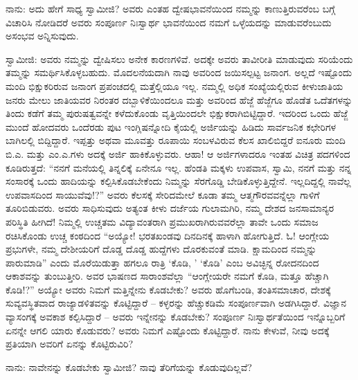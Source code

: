 ನಾನು: ಅದು ಹೇಗೆ ಸಾಧ್ಯ ಸ್ವಾಮೀಜಿ? ಅವರು ಎಂತಹ ದ್ವೇಷಭಾವನೆಯಿಂದ ನಮ್ಮನ್ನು ಕಾಣುತ್ತಿರುವರೆಂಬ ಬಗ್ಗೆ ವಿಚಾರಿಸಿ ನೋಡಿದರೆ ಅವರು ಸಂಪೂರ್ಣ ನಿಃಸ್ವಾರ್ಥ ಭಾವನೆಯಿಂದ ನಮಗೆ ಒಳ್ಳೆಯದನ್ನು ಮಾಡುವರೆಂಬುದು ಅಸಂಭವ ಅನ್ನಿಸುವುದು.

ಸ್ವಾಮೀಜಿ: ಅವರು ನಮ್ಮನ್ನು ದ್ವೇಷಿಸಲು ಅನೇಕ ಕಾರಣಗಳಿವೆ. ಅದಕ್ಕೇ ಅವರು ತಾವೀರೀತಿ ಮಾಡುವುದು ಸರಿಯೆಂದು ತಮ್ಮನ್ನು ಸಮರ್ಥಿಸಿಕೊಳ್ಳಬಹುದು. ಮೊದಲನೆಯದಾಗಿ ನಾವು ಅವರಿಂದ ಜಯಿಸಲ್ಪಟ್ಟ ಜನಾಂಗ. ಅಲ್ಲದೆ ಇಷ್ಟೊಂದು ಮಂದಿ ಭಿಕ್ಷುಕರಿರುವ ಜನಾಂಗ ಪ್ರಪಂಚದಲ್ಲಿ ಮತ್ತೆಲ್ಲಿಯೂ ಇಲ್ಲ. ನಮ್ಮಲ್ಲಿ ಅಧಿಕ ಸಂಖ್ಯೆಯಲ್ಲಿರುವ ಕೀಳುಜಾತಿಯ ಜನರು ಮೇಲು ಜಾತಿಯವರ ನಿರಂತರ ದಬ್ಬಾಳಿಕೆಯಿಂದಲೂ ಮತ್ತು ಅವರಿಂದ ಹೆಜ್ಜೆ ಹೆಜ್ಜೆಗೂ ಹೊಡೆತ ಒದೆತಗಳನ್ನು ತಿಂದು ಕಡೆಗೆ ತಮ್ಮ ಪುರುಷತ್ವವನ್ನೇ ಕಳೆದುಕೊಂಡು ವೃತ್ತಿಯಿಂದಲೇ ಭಿಕ್ಷುಕರಾಗಿಬಿಟ್ಟಿದ್ದಾರೆ. ಇದರಿಂದ ಒಂದು ಹೆಜ್ಜೆ ಮುಂದೆ ಹೋದವರು ಒಂದೆರಡು ಪುಟ ಇಂಗ್ಲಿಷನ್ನೋದಿ ಕೈಯಲ್ಲಿ ಅರ್ಜಿಯನ್ನು ಹಿಡಿದು ಸಾರ್ವಜನಿಕ ಕಛೇರಿಗಳ ಬಾಗಿಲಲ್ಲಿ ಬಿದ್ದಿದ್ದಾರೆ. ಇಪ್ಪತ್ತು ಅಥವಾ ಮೂವತ್ತು ರೂಪಾಯಿ ಸಂಬಳವಿರುವ ಕೆಲಸ ಖಾಲಿಬಿದ್ದರೆ ಐನೂರು ಮಂದಿ ಬಿ.ಎ. ಮತ್ತು ಎಂ.ಎ.ಗಳು ಅದಕ್ಕೆ ಅರ್ಜಿ ಹಾಕಿಕೊಳ್ಳುವರು. ಆಹಾ! ಆ ಅರ್ಜಿಗಳಾದರೂ ಇಂತಹ ವಿಚಿತ್ರ ಪದಗಳಿಂದ ಕೂಡಿರುತ್ತದೆ: “ನನಗೆ ಮನೆಯಲ್ಲಿ ತಿನ್ನಲಿಕ್ಕೆ ಏನೇನೂ ಇಲ್ಲ. ಹೆಂಡತಿ ಮಕ್ಕಳು ಉಪವಾಸ, ಸ್ವಾಮಿ, ನನಗೆ ಮತ್ತು ನನ್ನ ಸಂಸಾರಕ್ಕೆ ಒಂದು ಹಾದಿಯನ್ನು ಕಲ್ಪಿಸಿಕೊಡಬೇಕೆಂದು ನಿಮ್ಮನ್ನು ಸೆರಗೊಡ್ಡಿ ಬೇಡಿಕೊಳ್ಳುತ್ತಿದ್ದೇನೆ. ಇಲ್ಲದಿದ್ದಲ್ಲಿ ನಾವೆಲ್ಲ ಉಪವಾಸದಿಂದ ಸಾಯುವೆವು!?” ಅವರು ಕೆಲಸಕ್ಕೆ ಸೇರಿದಮೇಲೆ ಕೂಡಾ ತಮ್ಮ ಆತ್ಮಗೌರವವನ್ನೆಲ್ಲಾ ಗಾಳಿಗೆ ತೂರಿಬಿಡುವರು. ಅವರು ಸಾಧಿಸುವುದು ಅತ್ಯಂತ ಕೀಳು ದರ್ಜೆಯ ಗುಲಾಮಗಿರಿ, ನಮ್ಮ ದೇಶದ ಜನಸಾಮಾನ್ಯರ ಪರಿಸ್ಥಿತಿ ಹೀಗಿದೆ! ನಿಮ್ಮಲ್ಲಿ ಉಚ್ಚತಮ ವಿದ್ಯಾವಂತರಾಗಿ ಪ್ರಮುಖರಾಗಿರುವವರೆಲ್ಲಾ ತಾವೇ ಒಂದು ಸಮಾಜ ರಚಿಸಿಕೊಂಡು ಉಚ್ಚ ಕಂಠದಿಂದ “ಅಯ್ಯೋ! ಭರತಖಂಡವು ದಿನದಿನಕ್ಕೆ ಹಾಳಾಗಿ ಹೋಗುತ್ತಿದೆ. ಓ! ಆಂಗ್ಲೇಯ ಪ್ರಭುಗಳೇ, ನಮ್ಮ ದೇಶೀಯರಿಗೆ ದೊಡ್ಡ ದೊಡ್ಡ ಹುದ್ದೆಗಳು ದೊರಕುವಂತೆ ಮಾಡಿ. ಕ್ಷಾಮದಿಂದ ನಮ್ಮನ್ನು ಪಾರುಮಾಡಿ” ಎಂದು ಮೊರೆಯಿಡುತ್ತಾ ಹಗಲೂ ರಾತ್ರಿ ‘ಕೊಡಿ, ’ ‘ಕೊಡಿ’ ಎಂಬ ಅವಿಚ್ಛಿನ್ನ ರೋದನದಿಂದ ಆಕಾಶವನ್ನು ತುಂಬುತ್ತೀರಿ. ಅವರ ಭಾಷಣದ ಸಾರಾಂಶವೆಲ್ಲಾ “ಆಂಗ್ಲೇಯರೇ ನಮಗೆ ಕೊಡಿ, ಮತ್ತೂ ಹೆಚ್ಚಾಗಿ ಕೊಡಿ!?” ಅಯ್ಯೋ ಅವರು ನಿಮಗೆ ಮತ್ತಿನ್ನೇನು ಕೊಡಬೇಕು? ಅವರು ಹೊಗೆಬಂಡಿ, ತಂತಿಸಮಾಚಾರ, ದೇಶಕ್ಕೆ ಸುವ್ಯವಸ್ಥಿತವಾದ ರಾಜ್ಯಾಡಳಿತವನ್ನು ಕೊಟ್ಟಿದ್ದಾರೆ – ಕಳ್ಳರನ್ನು ಹೆಚ್ಚುಕಡಿಮೆ ಸಂಪೂರ್ಣವಾಗಿ ಅಡಗಿಸಿದ್ದಾರೆ. ವಿಜ್ಞಾನ ವ್ಯಾಸಂಗಕ್ಕೆ ಅವಕಾಶ ಕಲ್ಪಿಸಿದ್ದಾರೆ – ಅವರು ಇನ್ನೇನನ್ನು ಕೊಡಬೇಕು? ಸಂಪೂರ್ಣ ನಿಃಸ್ವಾರ್ಥತೆಯಿಂದ ಇನ್ನೊಬ್ಬರಿಗೆ ಏನನ್ನೇ ಆಗಲಿ ಯಾರು ಕೊಡುವರು? ಅವರು ನಿಮಗೆ ಎಷ್ಟೊಂದು ಕೊಟ್ಟಿದ್ದಾರೆ. ನಾನು ಕೇಳುವೆ, ನೀವು ಅದಕ್ಕೆ ಪ್ರತಿಯಾಗಿ ಅವರಿಗೆ ಏನನ್ನು ಕೊಟ್ಟಿರುವಿರಿ?

ನಾನು: ನಾವೇನನ್ನು ಕೊಡಬೇಕು ಸ್ವಾಮೀಜಿ? ನಾವು ತೆರಿಗೆಯನ್ನು ಕೊಡುವುದಿಲ್ಲವೆ?

